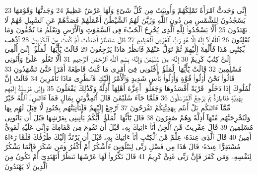 {\tiny\colorbox{cl_aya}{23}} إِنِّى وَجَدتُّ ٱمْرَأَةً تَمْلِكُهُمْ وَأُوتِيَتْ مِن كُلِّ شَىْءٍ وَلَهَا عَرْشٌ عَظِيمٌ
{\tiny\colorbox{cl_aya}{24}} وَجَدتُّهَا وَقَوْمَهَا يَسْجُدُونَ لِلشَّمْسِ مِن دُونِ ٱللَّهِ وَزَيَّنَ لَهُمُ ٱلشَّيْطَٰنُ أَعْمَٰلَهُمْ فَصَدَّهُمْ عَنِ ٱلسَّبِيلِ فَهُمْ لَا يَهْتَدُونَ
{\tiny\colorbox{cl_aya}{25}} أَلَّا يَسْجُدُوا۟ لِلَّهِ ٱلَّذِى يُخْرِجُ ٱلْخَبْءَ فِى ٱلسَّمَٰوَٰتِ وَٱلْأَرْضِ وَيَعْلَمُ مَا تُخْفُونَ وَمَا تُعْلِنُونَ
{\tiny\colorbox{cl_aya}{26}} ٱللَّهُ لَآ إِلَٰهَ إِلَّا هُوَ رَبُّ ٱلْعَرْشِ ٱلْعَظِيمِ
{\tiny\colorbox{cl_aya}{27}} قَالَ سَنَنظُرُ أَصَدَقْتَ أَمْ كُنتَ مِنَ ٱلْكَٰذِبِينَ
{\tiny\colorbox{cl_aya}{28}} ٱذْهَب بِّكِتَٰبِى هَٰذَا فَأَلْقِهْ إِلَيْهِمْ ثُمَّ تَوَلَّ عَنْهُمْ فَٱنظُرْ مَاذَا يَرْجِعُونَ
{\tiny\colorbox{cl_aya}{29}} قَالَتْ يَٰٓأَيُّهَا ٱلْمَلَؤُا۟ إِنِّىٓ أُلْقِىَ إِلَىَّ كِتَٰبٌ كَرِيمٌ
{\tiny\colorbox{cl_aya}{30}} إِنَّهُۥ مِن سُلَيْمَٰنَ وَإِنَّهُۥ بِسْمِ ٱللَّهِ ٱلرَّحْمَٰنِ ٱلرَّحِيمِ
{\tiny\colorbox{cl_aya}{31}} أَلَّا تَعْلُوا۟ عَلَىَّ وَأْتُونِى مُسْلِمِينَ
{\tiny\colorbox{cl_aya}{32}} قَالَتْ يَٰٓأَيُّهَا ٱلْمَلَؤُا۟ أَفْتُونِى فِىٓ أَمْرِى مَا كُنتُ قَاطِعَةً أَمْرًا حَتَّىٰ تَشْهَدُونِ
{\tiny\colorbox{cl_aya}{33}} قَالُوا۟ نَحْنُ أُو۟لُوا۟ قُوَّةٍ وَأُو۟لُوا۟ بَأْسٍ شَدِيدٍ وَٱلْأَمْرُ إِلَيْكِ فَٱنظُرِى مَاذَا تَأْمُرِينَ
{\tiny\colorbox{cl_aya}{34}} قَالَتْ إِنَّ ٱلْمُلُوكَ إِذَا دَخَلُوا۟ قَرْيَةً أَفْسَدُوهَا وَجَعَلُوٓا۟ أَعِزَّةَ أَهْلِهَآ أَذِلَّةً وَكَذَٰلِكَ يَفْعَلُونَ
{\tiny\colorbox{cl_aya}{35}} وَإِنِّى مُرْسِلَةٌ إِلَيْهِم بِهَدِيَّةٍ فَنَاظِرَةٌۢ بِمَ يَرْجِعُ ٱلْمُرْسَلُونَ
{\tiny\colorbox{cl_aya}{36}} فَلَمَّا جَآءَ سُلَيْمَٰنَ قَالَ أَتُمِدُّونَنِ بِمَالٍ فَمَآ ءَاتَىٰنِۦَ ٱللَّهُ خَيْرٌ مِّمَّآ ءَاتَىٰكُم بَلْ أَنتُم بِهَدِيَّتِكُمْ تَفْرَحُونَ
{\tiny\colorbox{cl_aya}{37}} ٱرْجِعْ إِلَيْهِمْ فَلَنَأْتِيَنَّهُم بِجُنُودٍ لَّا قِبَلَ لَهُم بِهَا وَلَنُخْرِجَنَّهُم مِّنْهَآ أَذِلَّةً وَهُمْ صَٰغِرُونَ
{\tiny\colorbox{cl_aya}{38}} قَالَ يَٰٓأَيُّهَا ٱلْمَلَؤُا۟ أَيُّكُمْ يَأْتِينِى بِعَرْشِهَا قَبْلَ أَن يَأْتُونِى مُسْلِمِينَ
{\tiny\colorbox{cl_aya}{39}} قَالَ عِفْرِيتٌ مِّنَ ٱلْجِنِّ أَنَا۠ ءَاتِيكَ بِهِۦ قَبْلَ أَن تَقُومَ مِن مَّقَامِكَ وَإِنِّى عَلَيْهِ لَقَوِىٌّ أَمِينٌ
{\tiny\colorbox{cl_aya}{40}} قَالَ ٱلَّذِى عِندَهُۥ عِلْمٌ مِّنَ ٱلْكِتَٰبِ أَنَا۠ ءَاتِيكَ بِهِۦ قَبْلَ أَن يَرْتَدَّ إِلَيْكَ طَرْفُكَ فَلَمَّا رَءَاهُ مُسْتَقِرًّا عِندَهُۥ قَالَ هَٰذَا مِن فَضْلِ رَبِّى لِيَبْلُوَنِىٓ ءَأَشْكُرُ أَمْ أَكْفُرُ وَمَن شَكَرَ فَإِنَّمَا يَشْكُرُ لِنَفْسِهِۦ وَمَن كَفَرَ فَإِنَّ رَبِّى غَنِىٌّ كَرِيمٌ
{\tiny\colorbox{cl_aya}{41}} قَالَ نَكِّرُوا۟ لَهَا عَرْشَهَا نَنظُرْ أَتَهْتَدِىٓ أَمْ تَكُونُ مِنَ ٱلَّذِينَ لَا يَهْتَدُونَ
